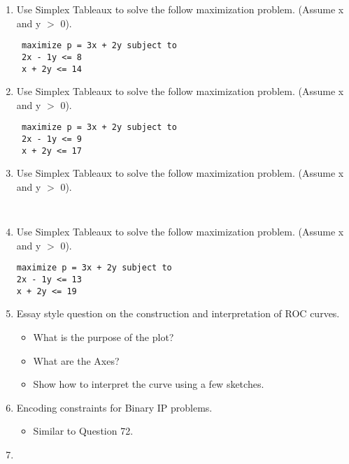 \documentclass[a4paper,12pt]{article}
\begin{document}
\begin{enumerate}
 \item Use Simplex Tableaux to solve the follow maximization problem. (Assume x and y $>$ 0).
 \begin{verbatim}  
 maximize p = 3x + 2y subject to
 2x - 1y <= 8
 x + 2y <= 14
 \end{verbatim}
 
 
 
 \item Use Simplex Tableaux to solve the follow maximization problem. (Assume x and y $>$ 0).
 \begin{verbatim} 
 maximize p = 3x + 2y subject to
 2x - 1y <= 9
 x + 2y <= 17
 \end{verbatim}
 
 \item Use Simplex Tableaux to solve the follow maximization problem. (Assume x and y $>$ 0).
 \begin{verbatim}


 \end{verbatim}
 
\item Use Simplex Tableaux to solve the follow maximization problem. (Assume x and y $>$ 0).
\begin{verbatim}
maximize p = 3x + 2y subject to
2x - 1y <= 13
x + 2y <= 19
\end{verbatim}
\item Essay style question on the construction and interpretation of ROC curves.
\begin{itemize}
	\item What is the purpose of the plot?
	\item What are the Axes?
	\item Show how to interpret the curve using a few sketches.
\end{itemize}
\item Encoding constraints for Binary IP problems.
\begin{itemize}
	\item Similar to Question 72.
\end{itemize}
\item 


\end{enumerate}
\end{document}

